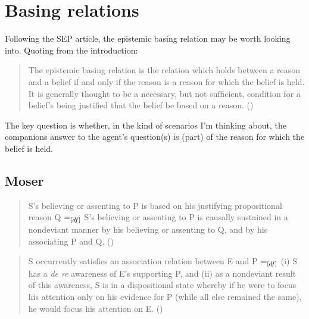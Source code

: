 \documentclass[10pt]{article}
\begin{document}

\section{Basing relations}
\label{sec:basing-relations}

Following the SEP article, the epistemic basing relation may be worth looking into.
Quoting from the introduction:
\begin{quote}
  The epistemic basing relation is the relation which holds between a reason and a belief if and only if the reason is a reason for which the belief is held. It is generally thought to be a necessary, but not sufficient, condition for a belief’s being justified that the belief be based on a reason.\nolinebreak
  \mbox{}\hfill\mbox{(\citeyear{Korcz:2019aa})}
\end{quote}

The key question is whether, in the kind of scenarios I'm thinking about, the companions answer to the agent's question(s) is (part) of the reason for which the belief is held.

\subsection{Moser}
\label{sec:moser}

\begin{quote}
  S’s believing or assenting to P is based on his justifying propositional reason Q \(=_{\text[df]}\) S’s believing or assenting to P is causally sustained in a nondeviant manner by his believing or assenting to Q, and by his associating P and Q.\nolinebreak
  \mbox{}\hfill\mbox{(\citeyear[157]{Moser:1991aa})}
\end{quote}

\begin{quote}
  S occurrently satisfies an association relation between E and P \(=_{\text[df]}\) (i) S has a \emph{de re} awareness of E’s supporting P, and (ii) as a nondeviant result of this awareness, S is in a dispositional state whereby if he were to focus his attention only on his evidence for P (while all else remained the same), he would focus his attention on E.\nolinebreak
  \mbox{}\hfill\mbox{(\citeyear[141--142]{Moser:1991aa})}
\end{quote}
\end{document}
